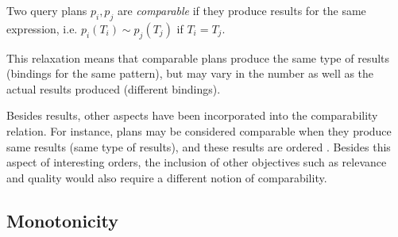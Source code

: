 \begin{definition}
  \label{def:comparability}
  Two query plans $p_i, p_j$ are \emph{comparable} if they produce results for the same expression, i.e. $p_i(T_i) \sim  p_j(T_j)$ if $T_i = T_j$. 
\end{definition}

This relaxation means that comparable plans produce the same type of results (bindings for the same pattern), but may vary in the number as well as the actual results produced (different bindings). 

Besides results, other aspects have been incorporated into the comparability relation. For instance, plans may be considered comparable when they produce same results (same type of results), and these results are ordered . 
Besides this aspect of interesting orders, the inclusion of other objectives such as relevance and quality would also require a different notion of comparability.  

\subsection{Monotonicity}
\label{sec:sharing}


